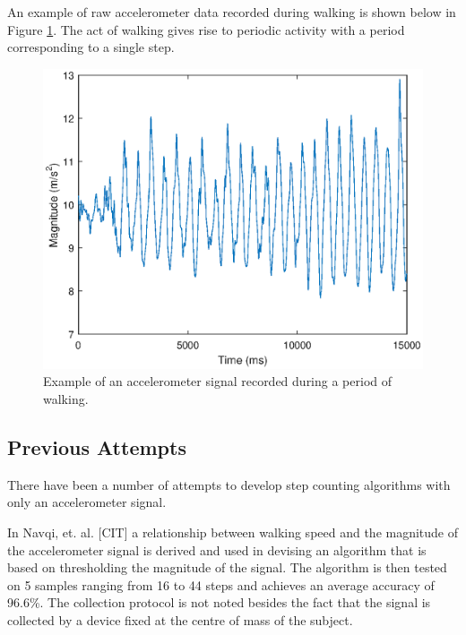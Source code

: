                 An example of raw accelerometer data recorded during walking is shown below in Figure \ref{img_accel_ex}. The act of walking gives rise to periodic activity with a period corresponding to a single step. 

                \begin{figure}[h]
                    \includegraphics[width=\textwidth]{Images/accel_signal.eps}
                    \centering
                    \caption{Example of an accelerometer signal recorded during a period of walking.}
                    \label{img_accel_ex}
                \end{figure}

            \subsection{Previous Attempts}

                There have been a number of attempts to develop step counting algorithms with only an accelerometer signal.

                In Navqi, et. al. [CIT] a relationship between walking speed and the magnitude of the accelerometer signal is derived and used in devising an algorithm that is based on thresholding the magnitude of the signal. The algorithm is then tested on 5 samples ranging from 16 to 44 steps and achieves an average accuracy of 96.6\%. The collection protocol is not noted besides the fact that the signal is collected by a device fixed at the centre of mass of the subject.


